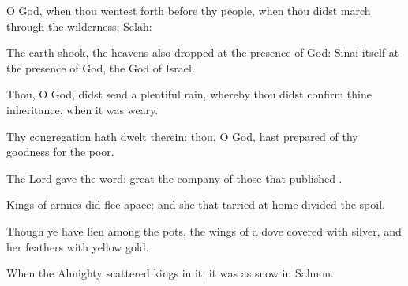 {\Q {}O
God, when thou wentest
forth
before thy
people, when thou didst
march through the
wilderness;
Selah:


\par }{\Q {}The
earth
shook, the
heavens also
dropped at the
presence of
God:
{}
Sinai
itself
{} at the
presence of
God, the
God of
Israel.


\par }{\Q {}Thou, O
God, didst
send a
plentiful
rain, whereby thou didst
confirm thine
inheritance, when it was
weary.


\par }{\Q {}Thy
congregation hath
dwelt therein: thou, O
God, hast
prepared of thy
goodness for the
poor.


\par }{\Q {}The
Lord
gave the
word:
great
{} the
company of those that
published
{}.


\par }{\Q {}Kings of
armies did
flee
apace: and she that
tarried at
home
divided the
spoil.


\par }{\Q {}Though ye have
lien among the
pots,
{} the
wings of a
dove
covered with
silver, and her
feathers with
yellow
gold.


\par }{\Q {}When the
Almighty
scattered
kings in it, it was
{} as
snow in
Salmon.


\par }{\BB \par }
